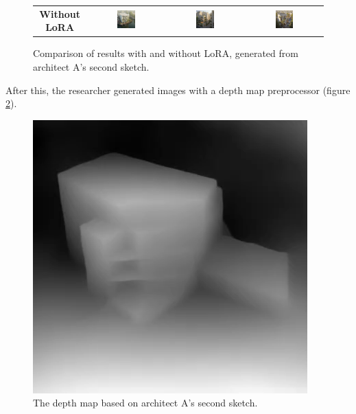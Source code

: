 \begin{figure}[H]
{\begin{tabular}{c c c c}
    \textbf{Without LoRA} &
    \includegraphics[width=0.25\textwidth]{Images/Results/Architect-A_unstructured-phase/generated_images/2/Zonder_lora_00008_.png} &
    \includegraphics[width=0.25\textwidth]{Images/Results/Architect-A_unstructured-phase/generated_images/2/Zonder_lora_00012_.png} & \includegraphics[width=0.25\textwidth]{Images/Results/Architect-A_unstructured-phase/generated_images/2/Zonder_lora_00013_.png} \\
  \end{tabular}
  }
  \caption{Comparison of results with and without LoRA, generated from architect A's second sketch.}
  \label{fig:lora-comparison-2wide}
\end{figure}
After this, the researcher generated images with a depth map preprocessor (figure \ref{fig:depth map}).
\begin{figure}[H]
    \centering
    \includegraphics[width=0.3\linewidth]{Images/Results/Architect-A_unstructured-phase/sketches/sketch_2_preprocessed_2.png}
    \caption{The depth map based on architect A's second sketch.}
    \label{fig:depth map}
\end{figure}

